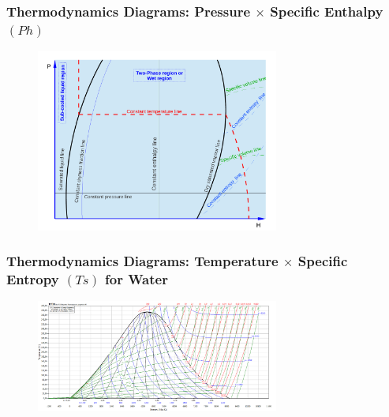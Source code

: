 \documentclass[10pt,compress]{beamer}
\begin{document}
\begin{frame}
 \frametitle{Thermodynamics Diagrams: Pressure $\times$ Specific Enthalpy $(Ph)$}
  \begin{center}
   \begin{figure}
      \includegraphics[width=8cm,height=7.cm,clip]{./Pics/Overview_Refrig17}
   \end{figure}
   \end{center}
\end{frame}

\begin{frame}
 \frametitle{Thermodynamics Diagrams: Temperature $\times$ Specific Entropy $(Ts)$ for Water}
  \begin{center}
   \begin{figure}
     \includegraphics[width=8cm,height=7.cm,clip]{./Pics/water_TS.png}
   \end{figure}
   \end{center}
\end{frame}
\end{document}
